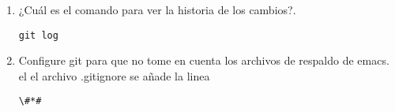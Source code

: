 \documentclass[12pt]{article}
\begin{document}
\begin{enumerate}
  \item ¿Cuál es el comando para ver la historia de los cambios?.  \hfill \\
\begin{lstlisting}[frame=single] 
git log
\end{lstlisting}
  \item Configure git para que no tome en cuenta los archivos de respaldo de emacs.  \hfill \\
el el archivo .gitignore
se añade la linea
\begin{lstlisting}[frame=single] 
\#*#
\end{lstlisting}

\end{enumerate}
\end{document}
